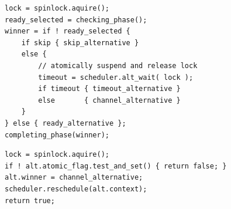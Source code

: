 \begin{lstfloat}
\begin{lstlisting}[caption={Code example of alting.}, label={lst:active_alting}, style={CustomC}]
lock = spinlock.aquire();
ready_selected = checking_phase();
winner = if ! ready_selected {
    if skip { skip_alternative }
    else {
        // atomically suspend and release lock
        timeout = scheduler.alt_wait( lock );
        if timeout { timeout_alternative }
        else       { channel_alternative }
    }
} else { ready_alternative };
completing_phase(winner);
\end{lstlisting}
\end{lstfloat}

\begin{lstfloat}
\begin{lstlisting}[caption={Code example of alting.}, label={lst:passive_alting}, style={CustomC}]
lock = spinlock.aquire();
if ! alt.atomic_flag.test_and_set() { return false; }
alt.winner = channel_alternative;
scheduler.reschedule(alt.context);
return true;
\end{lstlisting}
\end{lstfloat}

